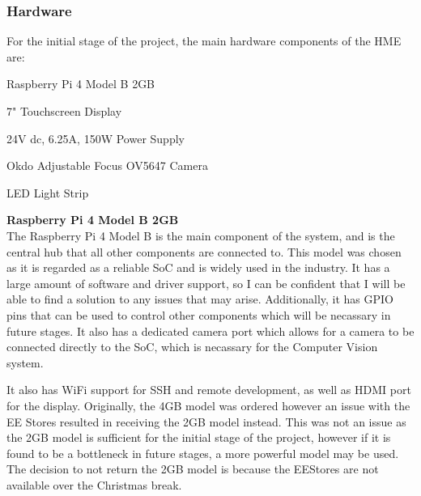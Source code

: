 \subsubsection{Hardware} \label{sec:hardware}
For the initial stage of the project, the main hardware components of the HME are:
\begin{mylist}
  \item Raspberry Pi 4 Model B 2GB
  \item 7" Touchscreen Display
  \item 24V dc, 6.25A, 150W Power Supply
  \item Okdo Adjustable Focus OV5647 Camera
  \item LED Light Strip
\end{mylist}
\textbf{Raspberry Pi 4 Model B 2GB} \\
The Raspberry Pi 4 Model B is the main component of the system, and is the central hub that all other components are connected to.
This model was chosen as it is regarded as a reliable SoC and is widely used in the industry. It has a large amount of software
and driver support, so I can be confident that I will be able to find a solution to any issues that may arise. Additionally, 
it has GPIO pins that can be used to control other components which will be necassary in future stages. It also has a 
dedicated camera port which allows for a camera to be connected directly to the SoC, which is necassary for the Computer Vision system.

It also has WiFi support for SSH and remote development, as well as HDMI port for the display.
Originally, the 4GB model was ordered however an issue with the EE Stores resulted in receiving the 2GB model instead.
This was not an issue as the 2GB model is sufficient for the initial stage of the project, however if it is found to be a bottleneck
in future stages, a more powerful model may be used. The decision to not return the 2GB model is because the EEStores are not
available over the Christmas break.

